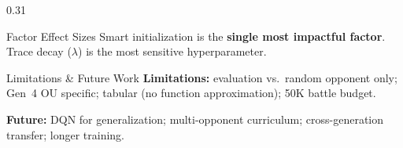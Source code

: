 \documentclass[final]{beamer}
\begin{document}
\begin{frame}[t]{}
\begin{columns}[t,totalwidth=\textwidth]
\begin{column}{0.31\textwidth}
\begin{block}{Factor Effect Sizes}
\vspace{0.1cm}
\flushleft
{\small Smart initialization is the \textbf{single most impactful
factor}. Trace decay ($\lambda$) is the most sensitive
hyperparameter.}
\end{block}

\begin{block}{Limitations \& Future Work}
\textbf{Limitations:} evaluation vs.\ random opponent only;
Gen~4 OU specific; tabular (no function approximation);
50K battle budget.

\textbf{Future:} DQN for generalization; multi-opponent
curriculum; cross-generation transfer; longer training.
\end{block}

\end{column}
\end{columns}

\vfill

\end{frame}
\end{document}
